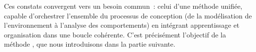 \medskip

\noindent
Ces constats convergent vers un besoin commun~: celui d'une méthode unifiée, capable d'orchestrer l'ensemble du processus de conception (de la modélisation de l'environnement à l'analyse des comportements) en intégrant apprentissage et organisation dans une boucle cohérente. C'est précisément l'objectif de la méthode , que nous introduisons dans la partie suivante.
